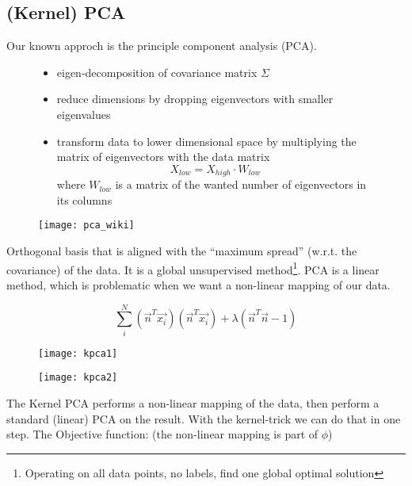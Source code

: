
\subsection*{(Kernel) PCA}

Our known approch is the principle component analysis (PCA).

\begin{figure}[H]
	\centering
	\begin{minipage}[b]{0.6\textwidth}
		\begin{itemize}
			\item eigen-decomposition of covariance matrix $\Sigma$
			\item reduce dimensions by dropping eigenvectors with smaller eigenvalues
			\item transform data to lower dimensional space by multiplying the matrix of eigenvectors with the data matrix \[X_{low} = X_{high} \cdot W_{low}\] where $W_{low}$ is a matrix of the wanted number of eigenvectors in its columns
		\end{itemize}
	\end{minipage}
	\begin{minipage}[b]{0.3\textwidth}
		\texttt{[image: pca\_wiki]}
	\end{minipage}
\end{figure}

Orthogonal basis that is aligned with the ``maximum spread'' (w.r.t. the covariance) of the data. It is a global unsupervised method\footnote{Operating on all data points, no labels, find one global optimal solution}. PCA is a linear method, which is problematic when we want a non-linear mapping of our data.

\begin{equation*}
    \sum_{i}^{N} (\vec{n}^T \vec{x_i}) (\vec{n}^T \vec{x_i}) + \lambda (\vec{n}^T \vec{n} - 1)
\end{equation*}

\begin{figure}[H]
	\centering
	\begin{minipage}[b]{0.45\textwidth}
		\texttt{[image: kpca1]}
	\end{minipage}
	\begin{minipage}[b]{0.45\textwidth}
		\texttt{[image: kpca2]}
	\end{minipage}
\end{figure}

The Kernel PCA performs a non-linear mapping of the data, then perform a standard (linear) PCA on the result. With the kernel-trick we can do that in one step. The Objective function: (the non-linear mapping is part of $\phi$)

